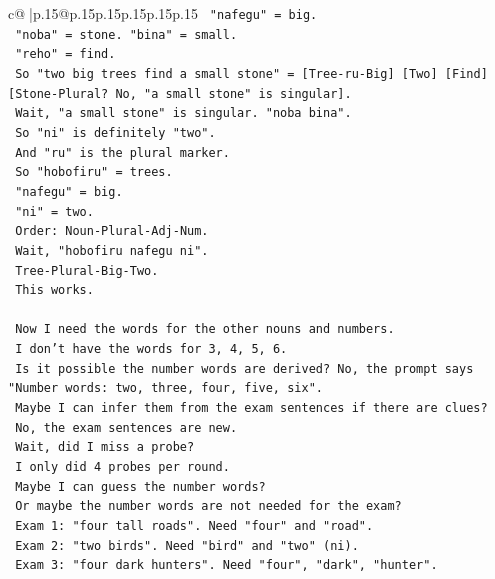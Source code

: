 \documentclass{article}
\begin{document}
{\begin{supertabular}{c@{$\;$}|p{.15\linewidth}@{}p{.15\linewidth}p{.15\linewidth}p{.15\linewidth}p{.15\linewidth}p{.15\linewidth}}
{{{\texttt{        "nafegu" = big.} \\
\texttt{        "noba" = stone. "bina" = small.} \\
\texttt{        "reho" = find.} \\
\texttt{        So "two big trees find a small stone" = {[}Tree{-}ru{-}Big{]} {[}Two{]} {[}Find{]} {[}Stone{-}Plural? No, "a small stone" is singular{]}.} \\
\texttt{        Wait, "a small stone" is singular. "noba bina".} \\
\texttt{        So "ni" is definitely "two".} \\
\texttt{        And "ru" is the plural marker.} \\
\texttt{        So "hobofiru" = trees.} \\
\texttt{        "nafegu" = big.} \\
\texttt{        "ni" = two.} \\
\texttt{        Order: Noun{-}Plural{-}Adj{-}Num.} \\
\texttt{        Wait, "hobofiru nafegu ni".} \\
\texttt{        Tree{-}Plural{-}Big{-}Two.} \\
\texttt{        This works.} \\
\\ 
\texttt{        Now I need the words for the other nouns and numbers.} \\
\texttt{        I don't have the words for 3, 4, 5, 6.} \\
\texttt{        Is it possible the number words are derived? No, the prompt says "Number words: two, three, four, five, six".} \\
\texttt{        Maybe I can infer them from the exam sentences if there are clues?} \\
\texttt{        No, the exam sentences are new.} \\
\texttt{        Wait, did I miss a probe?} \\
\texttt{        I only did 4 probes per round.} \\
\texttt{        Maybe I can guess the number words?} \\
\texttt{        Or maybe the number words are not needed for the exam?} \\
\texttt{        Exam 1: "four tall roads". Need "four" and "road".} \\
\texttt{        Exam 2: "two birds". Need "bird" and "two" (ni).} \\
\texttt{        Exam 3: "four dark hunters". Need "four", "dark", "hunter".} \\
}}}
\end{supertabular}}
\end{document}
